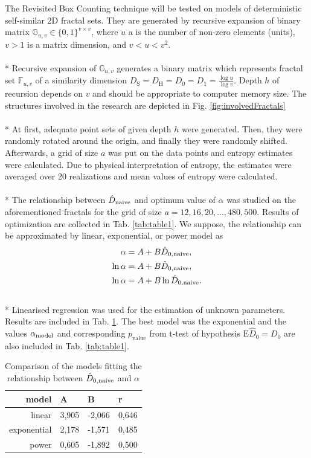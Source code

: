 The Revisited Box Counting technique will be tested on models of deterministic self-similar 2D fractal sets. They are generated by recursive expansion of binary matrix $\mathbb{G}_{u,v} \in \{ 0, 1 \}^{v \times v} $, where $u$ a is the number of non-zero elements (units), $v>1$ is a matrix dimension, and $v<u<v^2$. \\
\\*
Recursive expansion of $\mathbb{G}_{u,v}$ generates a binary matrix which represents fractal set $\mathbb{F}_{u,v}$ of a similarity dimension $D_{\text{S}} = D_{\text{H}} = D_{0} = D_{1} = \frac{\log{u}}{\log{v}}$. Depth $h$ of recursion depends on $v$ and should be appropriate to computer memory size. The structures involved in the research are depicted in Fig. \ref{fig:involvedFractals}\\
\\*
At first, adequate point sets of given depth $h$ were generated. Then, they were randomly rotated around the origin, and finally they were randomly shifted. Afterwards, a grid of size $a$ was put on the data points and entropy estimates were calculated. Due to physical interpretation of entropy, the estimates were averaged over 20 realizations and mean values of entropy were calculated. \\
\\*
The relationship between $\hat{D}_{\mbox{\scriptsize{naive}}}$ and optimum value of $\alpha$ was studied on the aforementioned fractals for the grid of size $a=12,16,20,...,480,500$. Results of optimization are collected in Tab. \ref{tab:table1}. We suppose, the relationship can be approximated by linear, exponential, or power model as
\begin{equation}
\label{eq:models}
\begin{split}
 \alpha &= A + B \hat{D}_{0,\mbox{\scriptsize{naive}}}, \\
 \ln \alpha &= A + B \hat{D}_{0,\mbox{\scriptsize{naive}}}, \\
 \ln \alpha &= A + B \ln \hat{D}_{0,\mbox{\scriptsize{naive}}}.
\end{split}
\end{equation}
\\*
Linearised regression was used for the estimation of unknown parameters. Results are included in Tab. \ref{tab:model_results}. The best model was the exponential and the values $\alpha_{\mbox{\scriptsize{model}}}$ and corresponding $p_{\text{value}}$ from t-test of hypothesis $\text{E}\hat{D}_{0} = D_{0}$ are also included in Tab. \ref{tab:table1}.

\begin{table}[]
\centering
\caption{Comparison of the models fitting the relationship between $\hat{D}_{0,\mbox{\scriptsize{naive}}}$ and $\alpha$}
\vspace{2mm}
\label{tab:model_results}
\begin{tabular}{r||l|l|l}
model       & A & B & r \\ \hline \hline
linear      & 3,905 & -2,066 & 0,646 \\
exponential & 2,178 & -1,571 & 0,485 \\
power       & 0,605 & -1,892 & 0,500
\end{tabular}
\end{table}